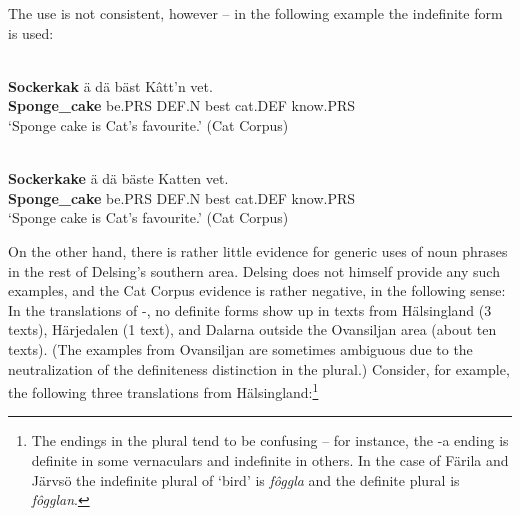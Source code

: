 \ea
	\z 
\z

The use is not consistent, however – in the following example the indefinite form is used:


\ea\label{}
\\
\gll 	\textbf{Sockerkak} ä  dä  bäst  Kâtt’n  vet.\\
		\textbf{Sponge\_cake} be.PRS  DEF.N  best  cat.DEF  know.PRS\\
\glt ‘Sponge cake is Cat’s favourite.’ (Cat Corpus)

\z

\ea\label{}
\\
\gll 	\textbf{Sockerkake} ä  dä  bäste  Katten  vet.\\
		\textbf{Sponge\_cake} be.PRS  DEF.N  best  cat.DEF  know.PRS\\
\glt 	‘Sponge cake is Cat’s favourite.’ (Cat Corpus)

\z

On the other hand, there is rather little evidence for generic uses of noun phrases in the rest of Delsing’s southern area. Delsing does not himself provide any such examples, and the Cat Corpus evidence is rather negative, in the following sense: In the translations of -, no definite forms show up in texts from Hälsingland (3 texts), Härjedalen (1 text), and Dalarna outside the Ovansiljan area (about ten texts). (The examples from Ovansiljan are sometimes ambiguous due to the neutralization of the definiteness distinction in the plural.) Consider, for example, the following three translations from Hälsingland:\footnote{ The endings in the plural tend to be confusing – for instance, the -a ending is definite in some vernaculars and indefinite in others. In the case of Färila and Järvsö the indefinite plural of ‘bird’ is \textit{fôggla} and the definite plural is \textit{fôgglan}. }

